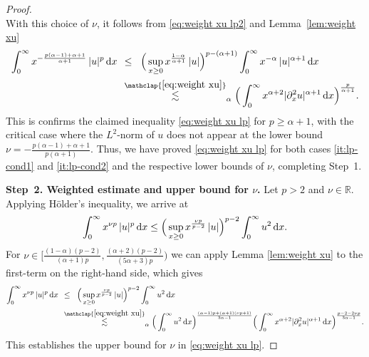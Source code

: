 \documentclass[reqno,12pt]{amsart}
\renewcommand{\d}{\ensuremath{\mathrm{d}}}
\newcommand{\R}{\ensuremath{\mathbb{R}}}
\renewcommand{\d}{\ensuremath{{\rm d}}}
\numberwithin{equation}{section}
\begin{document}
\begin{proof}
\begin{equation*}
\end{equation*}
%
With this choice of $\nu$, it follows from \eqref{eq:weight xu lp2} and Lemma~\ref{lem:weight xu}
%
\begin{align}\label{eq:weight xu lp3}
\int_0^\infty x^{ - \frac{p(\alpha -1) + \alpha +1}{\alpha +1}} \, |u|^p \, \d x 
\;\, &\leq_{\phantom\alpha}   \Big( \sup_{x \ge 0} x^{ \frac{1-\alpha}{\alpha+1}} \, |u|\Big)^{p-(\alpha +1)}
\int_0^\infty x^{-\alpha} \, |u|^{\alpha +1} \, \d x  \nonumber \\
& \stackrel{\mathclap{\eqref{eq:weight xu}}}{\lesssim}_{\alpha} \Big( \int_0^\infty x^{\alpha+2} |\partial_x^2 u|^{\alpha +1} \, \d x \Big)^{\frac{p}{\alpha+1}}.
\end{align}
%
This is confirms the claimed inequality \eqref{eq:weight xu lp} for $p\geq \alpha +1$, with the critical case where the $L^2$-norm of $u$ does not appear at the lower bound $\nu = - \frac{p(\alpha -1) + \alpha +1}{p(\alpha +1)}$. 
%
Thus, we have proved \eqref{eq:weight xu lp} for both cases \eqref{it:lp-cond1} and \eqref{it:lp-cond2} and the respective lower bounds of $\nu$, completing Step~1. 

%
\bigskip
%

\noindent\textbf{Step~2. Weighted estimate and upper bound for $\nu$.} Let $p > 2$  and $\nu \in \R$. 
%
Applying H\"older's inequality, we arrive at
%
\begin{equation*}
\int_0^\infty x^{\nu p} \, |u|^p \, \d x 
\leq \Big( \sup_{x \ge 0}x^{\frac{\nu p}{p-2}} \,|u|\Big)^{p-2} \int_0^\infty u^2 \, \d x.
\end{equation*}
%
For $\nu \in \big[\frac{(1-\alpha)(p-2)}{(\alpha +1) p}, \frac{(\alpha+2) (p-2)}{(5\alpha +3) p}\big)$ we can apply Lemma \ref{lem:weight xu} to the first-term on the right-hand side, which gives
%
\begin{align}
\int_0^\infty x^{\nu p} \, |u|^p \, \d x 
\,\; &\leq_{\phantom\alpha} \Big( \sup_{x \ge 0}x^{\frac{\nu p}{p-2}} \,|u|\Big)^{p-2} \int_0^\infty u^2 \, \d x \nonumber \\
&\stackrel{\mathclap{\eqref{eq:weight xu}}}{\lesssim}_{\alpha} \Big( \int_0^\infty u^2 \, \d x\Big)^{\frac{(\alpha -1) p + (\alpha+1) (\nu p+1)}{3\alpha -1}} \Big( \int_0^\infty x^{\alpha+2} |\partial_x^2 u|^{\alpha +1} \, \d x \Big)^{\frac{p-2 - 2 \nu p}{3\alpha-1}}. \label{eq:weight xu lp4}
\end{align}
%
This establishes the upper bound for $\nu$ in \eqref{eq:weight xu lp}. 

%
\bigskip
%


\end{proof}
\end{document}
